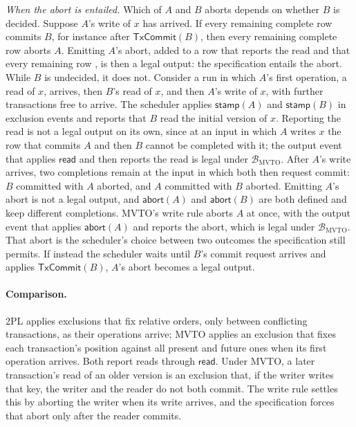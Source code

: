 \emph{When the abort is entailed.}  Which of $A$ and $B$ aborts depends on
whether $B$ is decided.  Suppose $A$'s write of $x$ has arrived.  If every
remaining complete row commits $B$, for instance after $\mathsf{TxCommit}(B)$,
then every remaining complete row aborts $A$.  Emitting $A$'s abort, added to a
row that reports the read and that every remaining row \outrel, is then
a legal output: the specification entails the abort.  While $B$ is undecided, it
does not.  Consider a run in which $A$'s first operation, a read of $x$,
arrives, then $B$'s read of $x$, and then $A$'s write of $x$, with further
transactions free to arrive.  The scheduler applies $\mathsf{stamp}(A)$ and
$\mathsf{stamp}(B)$ in exclusion events and reports that $B$ read the initial
version of $x$.  Reporting the read is not a legal output on its own, since at an
input in which $A$ writes $x$ the row that commits $A$ and then $B$ cannot be
completed with it; the output event that applies $\mathsf{read}$ and then
reports the read is legal under $\mathcal B_{\mathrm{MVTO}}$.  After $A$'s
write arrives, two completions remain at the input in which both then request
commit: $B$ committed with $A$ aborted, and $A$ committed with $B$ aborted.
Emitting $A$'s abort is not a legal output, and $\mathsf{abort}(A)$ and
$\mathsf{abort}(B)$ are both defined and keep different completions.  MVTO's
write rule aborts $A$ at once, with the output event that applies
$\mathsf{abort}(A)$ and reports the abort, which is legal under
$\mathcal B_{\mathrm{MVTO}}$.  That abort is the scheduler's choice between two
outcomes the specification still permits.  If instead the scheduler waits until
$B$'s commit request arrives and applies $\mathsf{TxCommit}(B)$, $A$'s abort
becomes a legal output.

\paragraph{Comparison.}
2PL applies exclusions that fix relative orders, only between conflicting
transactions, as their operations arrive; MVTO applies an exclusion that fixes each
transaction's position against all present and future ones when its first
operation arrives.  Both report reads through $\mathsf{read}$.  Under MVTO, a
later transaction's read of an older version is an exclusion that, if the
writer writes that key, the writer and the reader do not both commit.  The
write rule settles this by aborting the writer when its write arrives, and the
specification forces that abort only after the reader commits.
